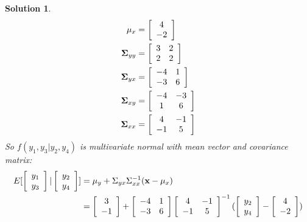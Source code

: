 \documentclass[11pt]{article}
\newtheorem{sol}{Solution}
\begin{document}
\begin{sol}
\begin{align*}
		{\bf \mu}_x &=  \left[\begin{array}{c} 4\\ -2\end{array}\right]\\
		{\bf \Sigma}_{yy} &= \left[\begin{array}{cc} 3&2 \\ 2& 2\end{array}\right]\\
		{\bf \Sigma}_{yx} &= \left[\begin{array}{cc} -4& 1\\ -3&6 \end{array}\right]\\
		{\bf \Sigma}_{xy} &= \left[\begin{array}{cc}-4 &-3 \\ 1& 6\end{array}\right]\\
		{\bf \Sigma}_{xx} &= \left[\begin{array}{cc} 4& -1\\ -1&5 \end{array}\right]
	\end{align*}
	So $f(y_1, y_3|y_2, y_4)$ is multivariate normal with mean vector and covariance matrix:
	\begin{align*}
		E[\left[\begin{array}{c} y_1\\ y_3\end{array}\right]|\left[\begin{array}{c} y_2\\ y_4\end{array}\right]] &= {\bf \mu}_y + \Sigma_{yx}\Sigma_{xx}^{-1}({\bf x} - {\bf \mu}_x)\\
		&=\left[\begin{array}{c} 3\\ -1\end{array}\right] + \left[\begin{array}{cc} -4& 1\\ -3&6 \end{array}\right]\left[\begin{array}{cc} 4& -1\\ -1&5 \end{array}\right]^{-1}(\left[\begin{array}{c} y_2\\ y_4\end{array}\right] - \left[\begin{array}{c} 4\\ -2\end{array}\right])\\

\end{align*}
\end{sol}
\end{document}
